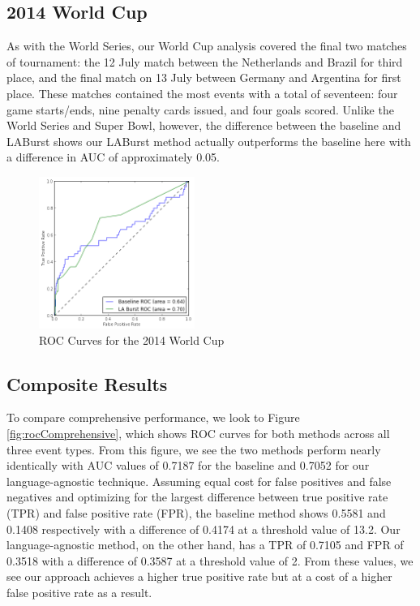 \documentclass{sig-alternate}
\begin{document}
\subsection{2014 World Cup}

As with the World Series, our World Cup analysis covered the final two matches of tournament: the 12 July match between the Netherlands and Brazil for third place, and the final match on 13 July between Germany and Argentina for first place.
These matches contained the most events with a total of seventeen: four game starts/ends, nine penalty cards issued, and four goals scored.
Unlike the World Series and Super Bowl, however, the difference between the baseline and LABurst shows our LABurst method actually outperforms the baseline here with a difference in AUC of approximately 0.05.

\begin{figure}[hbtp]
\begin{center}
\includegraphics[width=2in]{./figures/roc_2014_WorldCup.png}
\caption{ROC Curves for the 2014 World Cup}
\label{fig:roc2014WorldCup}
\end{center}
\end{figure}

\subsection{Composite Results}

To compare comprehensive performance, we look to Figure \ref{fig:rocComprehensive}, which shows ROC curves for both methods across all three event types.
From this figure, we see the two methods perform nearly identically with AUC values of 0.7187 for the baseline and 0.7052 for our language-agnostic technique.
Assuming equal cost for false positives and false negatives and optimizing for the largest difference between true positive rate (TPR) and false positive rate (FPR), the baseline method shows 0.5581 and 0.1408 respectively with a difference of 0.4174 at a threshold value of 13.2.
Our language-agnostic method, on the other hand, has a TPR of 0.7105 and FPR of 0.3518 with a difference of 0.3587 at a threshold value of 2.
From these values, we see our approach achieves a higher true positive rate but at a cost of a higher false positive rate as a result.
\end{document}
